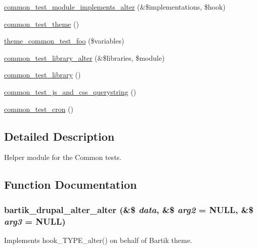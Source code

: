 \begin{DoxyCompactItemize}
\item 
\hyperlink{common__test_8module_a4a6004807e1f754a0f9680cba92689b9}{common\_\-test\_\-module\_\-implements\_\-alter} (\&\$implementations, \$hook)
\item 
\hyperlink{common__test_8module_a51c6df449100ce19786976b207953706}{common\_\-test\_\-theme} ()
\item 
\hyperlink{common__test_8module_a887af90f11eb1a98dd3ce095da8725ca}{theme\_\-common\_\-test\_\-foo} (\$variables)
\item 
\hyperlink{common__test_8module_a1063219ba57ea27906b1b9e7dee501da}{common\_\-test\_\-library\_\-alter} (\&\$libraries, \$module)
\item 
\hyperlink{common__test_8module_ad3142c4a59e048196244a5e1e07fd60d}{common\_\-test\_\-library} ()
\item 
\hyperlink{common__test_8module_abc4014dbd035130749965918d7ad1e04}{common\_\-test\_\-js\_\-and\_\-css\_\-querystring} ()
\item 
\hyperlink{common__test_8module_af635bc632ff8fae03cc7ffc65262b065}{common\_\-test\_\-cron} ()
\end{DoxyCompactItemize}


\subsection{Detailed Description}
Helper module for the Common tests. 

\subsection{Function Documentation}
\hypertarget{common__test_8module_a41a0d34d1de16cce1b6532ccc5ae8245}{
\subsubsection[{bartik\_\-drupal\_\-alter\_\-alter}]{\setlength{\rightskip}{0pt plus 5cm}bartik\_\-drupal\_\-alter\_\-alter (\&\$ {\em data}, \/  \&\$ {\em arg2} = {\ttfamily NULL}, \/  \&\$ {\em arg3} = {\ttfamily NULL})}}
\label{common__test_8module_a41a0d34d1de16cce1b6532ccc5ae8245}
Implements hook\_\-TYPE\_\-alter() on behalf of Bartik theme.

